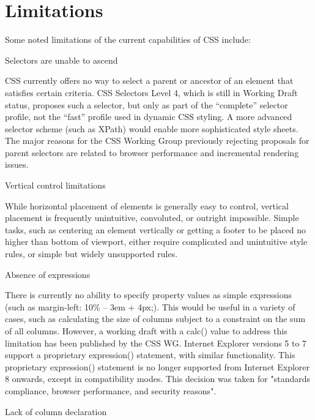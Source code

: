 \chapter{Limitations}


Some noted limitations of the current capabilities of CSS include:

\begin{compactitem}

\item Selectors are unable to ascend

CSS currently offers no way to select a parent or ancestor of an element that satisfies certain criteria. CSS Selectors Level 4, which is still in Working Draft status, proposes such a selector, but only as part of the “complete” selector profile, not the “fast” profile used in dynamic CSS styling. A more advanced selector scheme (such as XPath) would enable more sophisticated style sheets. The major reasons for the CSS Working Group previously rejecting proposals for parent selectors are related to browser performance and incremental rendering issues.

\item Vertical control limitations 

While horizontal placement of elements is generally easy to control, vertical placement is frequently unintuitive, convoluted, or outright impossible. Simple tasks, such as centering an element vertically or getting a footer to be placed no higher than bottom of viewport, either require complicated and unintuitive style rules, or simple but widely unsupported rules.

\item Absence of expressions 

There is currently no ability to specify property values as simple expressions (such as margin-left: 10\% – 3em + 4px;). This would be useful in a variety of cases, such as calculating the size of columns subject to a constraint on the sum of all columns. However, a working draft with a calc() value to address this limitation has been published by the CSS WG. Internet Explorer versions 5 to 7 support a proprietary expression() statement, with similar functionality. This proprietary expression() statement is no longer supported from Internet Explorer 8 onwards, except in compatibility modes. This decision was taken for "standards compliance, browser performance, and security reasons".

\item Lack of column declaration 


\end{compactitem}

